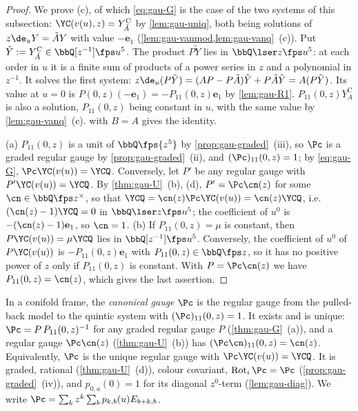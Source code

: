 \begin{proof}
We prove (c), of which \eqref{eq:gau-G} is the case of the two systems of this subsection: $\YC(v(u),z)=Y^{\mathrm C}_{\tilde A}$ by \cref{lem:gau-uniq}, both being solutions of $z\de_uY=\tilde AY$ with value $-\mathbf e_1$ (\cref{lem:gau-vanmod,lem:gau-vanq}~(c)). Put $\tilde Y:=Y^{\mathrm C}_{\tilde A}\in\bbQ[z^{-1}]\fps u^5$. The product $P\tilde Y$ lies in $\bbQ\lser z\fps u^5$: at each order in $u$ it is a finite sum of products of a power series in $z$ and a polynomial in $z^{-1}$. It solves the first system: $z\de_u(P\tilde Y)=(AP-P\tilde A)\tilde Y+P\tilde A\tilde Y=A(P\tilde Y)$. Its value at $u=0$ is $P(0,z)(-\mathbf e_1)=-P_{11}(0,z)\mathbf e_1$ by \cref{lem:gau-R1}. $P_{11}(0,z)Y^{\mathrm C}_A$ is also a solution, $P_{11}(0,z)$ being constant in $u$, with the same value by \cref{lem:gau-vanq}~(c).  with $B=A$ gives the identity.

(a) $P_{11}(0,z)$ is a unit of $\bbQ\fps{z^5}$ by \cref{prop:gau-graded}~(iii), so $\Pc$ is a graded regular gauge by \cref{prop:gau-graded}~(ii), and $(\Pc)_{11}(0,z)=1$; by \eqref{eq:gau-G}, $\Pc\YC(v(u))=\YCQ$. Conversely, let $P'$ be any regular gauge with $P'\YC(v(u))=\YCQ$. By \cref{thm:gau-U}~(b), (d), $P'=\Pc\cn(z)$ for some $\cn\in\bbQ\fps z^\times$, so that $\YCQ=\cn(z)\Pc\YC(v(u))=\cn(z)\YCQ$, i.e.\ $(\cn(z)-1)\YCQ=0$ in $\bbQ\lser z\fps u^5$; the coefficient of $u^0$ is $-(\cn(z)-1)\mathbf e_1$, so $\cn=1$. (b) If $P_{11}(0,z)=\mu$ is constant, then $P\YC(v(u))=\mu\YCQ$ lies in $\bbQ[z^{-1}]\fps u^5$. Conversely, the coefficient of $u^0$ of $P\YC(v(u))$ is $-P_{11}(0,z)\mathbf e_1$ with $P_{11}(0,z)\in\bbQ\fps z$, so it has no positive power of $z$ only if $P_{11}(0,z)$ is constant. With $P=\Pc\cn(z)$ we have $P_{11}(0,z)=\cn(z)$, which gives the last assertion.
\end{proof}

\begin{defn}
\label{def:gau-can}
In a conifold frame, the \emph{canonical gauge} $\Pc$ is the regular gauge from the pulled-back model to the quintic system with $(\Pc)_{11}(0,z)=1$. It exists and is unique: $\Pc=P\,P_{11}(0,z)^{-1}$ for any graded regular gauge $P$ (\cref{thm:gau-G}~(a)), and a regular gauge $\Pc\cn(z)$ (\cref{thm:gau-U}~(b)) has $(\Pc\cn)_{11}(0,z)=\cn(z)$. Equivalently, $\Pc$ is the unique regular gauge with $\Pc\YC(v(u))=\YCQ$. It is graded, rational (\cref{thm:gau-U}~(d)), colour covariant, $\operatorname{Rot}_i\Pc=\Pc$ (\cref{prop:gau-graded}~(iv)), and $p_{0,a}(0)=1$ for its diagonal $z^0$-term (\cref{lem:gau-diag}). We write $\Pc=\sum_kz^k\sum_bp_{k,b}(u)E_{b+k,b}$.
\end{defn}

